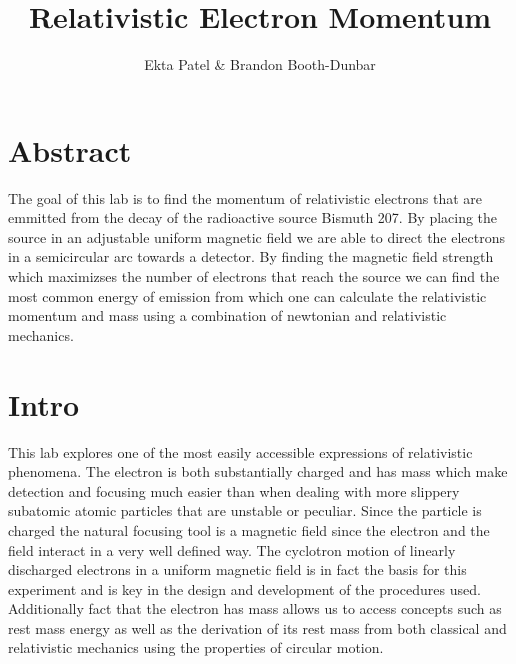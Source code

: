 


\newcommand{\ig}[2][width=4in]{\texttt{[image: \#2]}}    		
\usepackage{graphicx}					
\usepackage{amssymb}
\usepackage{pgfplotstable}
\usepackage{float}
\usepackage{caption}
\captionsetup[table]{justification=justified,singlelinecheck=false, position=bottom}


\header {\today}							
\title{Relativistic Electron Momentum}
\author{Ekta Patel \& Brandon Booth-Dunbar}



\section{Abstract}
\begin{em}
The goal of this lab is to find the momentum of relativistic electrons that are emmitted from the decay of the radioactive source Bismuth 207.  By placing the source in an adjustable uniform magnetic field we are  able to direct the electrons in a semicircular arc towards a detector.  By finding the magnetic field strength which maximizses the number of electrons that reach the source we can find the most common energy of emission from which one can calculate the relativistic  momentum and mass using a combination of newtonian and relativistic mechanics. 
\end{em}

\section{Intro}
This lab explores one of the most easily accessible expressions of relativistic phenomena. The electron is both substantially charged and has mass which make detection and focusing much  easier than when dealing with more slippery subatomic  atomic particles that are unstable or peculiar.  Since the particle is charged the natural focusing tool is a magnetic field since the electron and the field interact in a very well defined way. The cyclotron motion of linearly discharged electrons in a uniform magnetic field is in fact the basis for this experiment and is key in the design and development of the procedures used. Additionally fact that the  electron has mass allows us to access concepts such as rest mass energy as well as the derivation of its rest mass from both classical and relativistic mechanics using the properties of circular motion.  

